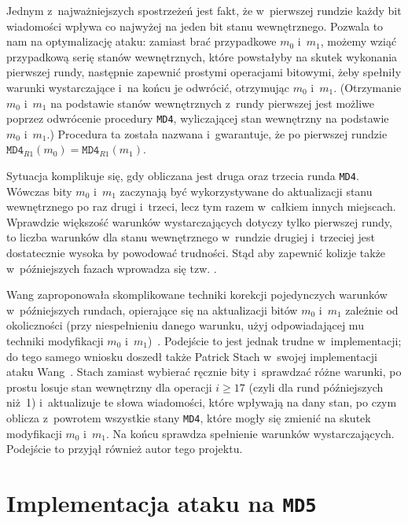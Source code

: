 \documentclass[12pt,a4paper,twoside]{article}
\begin{document}
Jednym z~najważniejszych spostrzeżeń jest fakt, że w~pierwszej rundzie każdy
bit wiadomości wpływa co najwyżej na jeden bit stanu wewnętrznego. Pozwala to
nam na optymalizację ataku: zamiast brać przypadkowe $m_0$ i~$m_1$, możemy
wziąć przypadkową serię stanów wewnętrznych, które powstałyby na skutek
wykonania pierwszej rundy, następnie zapewnić prostymi operacjami bitowymi,
żeby spełniły warunki wystarczające i~na końcu je odwrócić, otrzymując $m_0$
i~$m_1$. (Otrzymanie $m_0$ i~$m_1$ na podstawie stanów wewnętrznych z~rundy
pierwszej jest możliwe poprzez odwrócenie procedury \texttt{MD4}, wyliczającej
stan wewnętrzny na podstawie $m_0$ i~$m_1$.) Procedura ta została nazwana
 i~gwarantuje, że po pierwszej rundzie
$\mathtt{MD4}_{R1}(m_0) = \mathtt{MD4}_{R1}(m_1)$.

Sytuacja komplikuje się, gdy obliczana jest druga oraz trzecia runda
\texttt{MD4}. Wówczas bity $m_0$ i~$m_1$ zaczynają być wykorzystywane do
aktualizacji stanu wewnętrznego po raz drugi i~trzeci, lecz tym razem w~całkiem
innych miejscach. Wprawdzie większość warunków wystarczających dotyczy tylko
pierwszej rundy,  to liczba warunków dla stanu wewnętrznego w~rundzie drugiej
i~trzeciej jest dostatecznie wysoka by powodować trudności. Stąd aby zapewnić
kolizje także w~późniejszych fazach wprowadza się tzw. .

Wang zaproponowała skomplikowane techniki korekcji pojedynczych warunków
w~późniejszych rundach, opierające się na aktualizacji bitów $m_0$ i~$m_1$
zależnie od okoliczności (przy niespełnieniu danego warunku, użyj
odpowiadającej mu techniki modyfikacji $m_0$ i~$m_1$)~\cite{wang2005md4}.
Podejście to jest jednak trudne w~implementacji; do tego samego wniosku doszedł
także Patrick Stach w~swojej implementacji ataku Wang~\cite{stach2005md4}.
Stach zamiast wybierać ręcznie bity i~sprawdzać różne warunki, po prostu losuje
stan wewnętrzny dla operacji $i \geq 17$ (czyli dla rund późniejszych niż~1)
i~aktualizuje te słowa wiadomości, które wpływają na dany stan, po czym oblicza
z~powrotem wszystkie stany \texttt{MD4}, które mogły się zmienić na skutek
modyfikacji $m_0$ i~$m_1$. Na końcu sprawdza spełnienie warunków
wystarczających. Podejście to przyjął również autor tego projektu.

\newpage

\section{Implementacja ataku na \texttt{MD5}}
\end{document}
